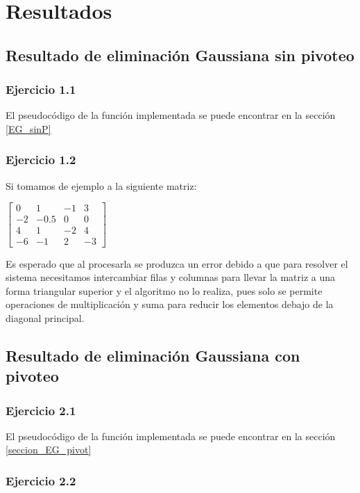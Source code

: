 \section{Resultados}
\label{resultados}

\subsection{Resultado de eliminación Gaussiana sin pivoteo}
\label{resultados EG}

\subsubsection{Ejercicio 1.1}
El pseudocódigo de la función implementada se puede encontrar en la sección \ref{EG_sinP}

\subsubsection{Ejercicio 1.2}

Si tomamos de ejemplo a la siguiente matriz:

\begin{center}
$\begin{bmatrix}
0 & 1 & -1 & 3\\
-2 & -0.5 & 0 & 0\\
4 & 1 & -2 & 4\\
-6 & -1 & 2 & -3
\end{bmatrix}$
\end{center}
                  
Es esperado que al procesarla se produzca un error debido a que para resolver el sistema necesitamos intercambiar filas y columnas para llevar la matriz a una forma triangular superior y el algoritmo no lo realiza, pues solo se permite operaciones de multiplicación y suma para reducir los elementos debajo de la diagonal principal.

\subsection{Resultado de eliminación Gaussiana con pivoteo}
\label{resultados EG c/p}
\subsubsection{Ejercicio 2.1}
El pseudocódigo de la función implementada se puede encontrar en la sección \ref{seccion_EG_pivot}

\subsubsection{Ejercicio 2.2}

